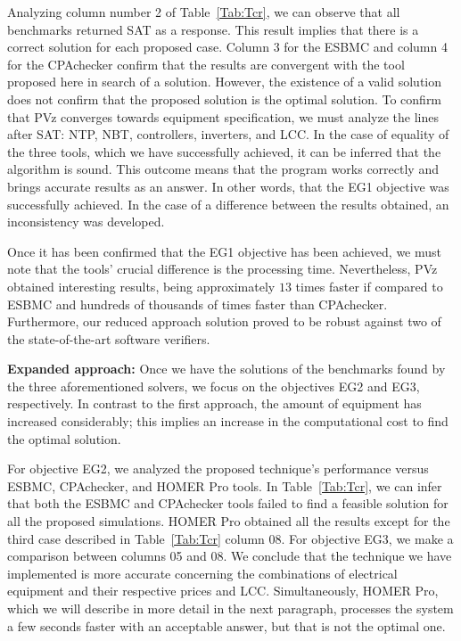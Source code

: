 \documentclass[a4paper,donotrepeattitle,fleqn]{cas-dc}
\begin{document}
Analyzing column number 2 of Table~\ref{Tab:Tcr}, we can observe that all benchmarks returned SAT as a response. This result implies that there is a correct solution for each proposed case. Column 3 for the ESBMC and column 4 for the CPAchecker confirm that the results are convergent with the tool proposed here in search of a solution. However, the existence of a valid solution does not confirm that the proposed solution is the optimal solution. To confirm that PVz converges towards equipment specification, we must analyze the lines after SAT: NTP, NBT, controllers, inverters, and LCC. In the case of equality of the three tools, which we have successfully achieved, it can be inferred that the algorithm is sound. This outcome means that the program works correctly and brings accurate results as an answer. In other words, that the EG1 objective was successfully achieved. In the case of a difference between the results obtained, an inconsistency was developed.

Once it has been confirmed that the EG1 objective has been achieved, we must note that the tools' crucial difference is the processing time. Nevertheless, PVz obtained interesting results, being approximately $13$ times faster if compared to ESBMC and hundreds of thousands of times faster than CPAchecker. Furthermore, our reduced approach solution proved to be robust against two of the state-of-the-art software verifiers.

\textbf{Expanded approach:} Once we have the solutions of the benchmarks found by the three aforementioned solvers, we focus on the objectives EG2 and EG3, respectively. In contrast to the first approach, the amount of equipment has increased considerably; this implies an increase in the computational cost to find the optimal solution.

For objective EG2, we analyzed the proposed technique's performance versus ESBMC, CPAchecker, and HOMER Pro tools. In Table~\ref{Tab:Tcr}, we can infer that both the ESBMC and CPAchecker tools failed to find a feasible solution for all the proposed simulations. HOMER Pro obtained all the results except for the third case described in Table~\ref{Tab:Tcr} column 08. For objective EG3, we make a comparison between columns 05 and 08. We conclude that the technique we have implemented is more accurate concerning the combinations of electrical equipment and their respective prices and LCC. Simultaneously, HOMER Pro, which we will describe in more detail in the next paragraph, processes the system a few seconds faster with an acceptable answer, but that is not the optimal one.
\end{document}

